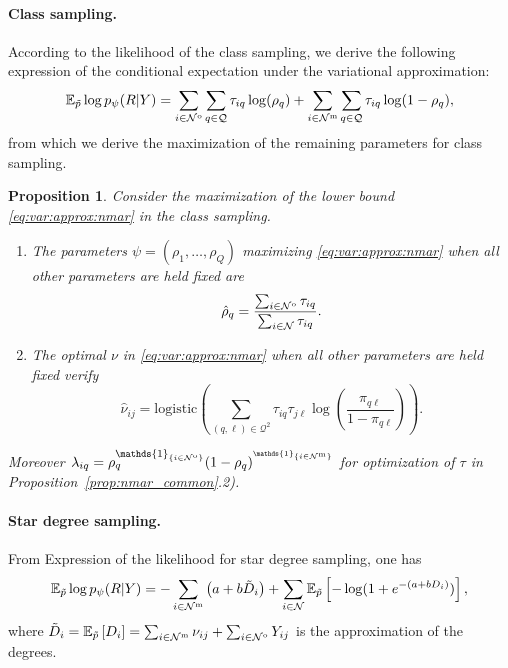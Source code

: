 \documentclass[10pt]{article}
\newcommand{\1}{\mathds{1}}
\newcommand{\MA}{Y}
\newcommand{\block}{\mathcal{Q}}
\newcommand{\node}{\mathcal{N}}
\newcommand{\nodeO}{\node^\text{\rm o}}
\newcommand{\nodeM}{\node^\text{\rm m}}
\newcommand{\Ebb}{\mathbb{E}}
\newtheorem{proposition}{Proposition}
\begin{document}
\paragraph*{\bf Class sampling.}  According to the
likelihood of the  class sampling, we derive
the  following expression  of the  conditional expectation  under the
variational approximation:
\begin{equation}\nonumber
  \mathbb{E}_{\tilde{p}} \log p_\psi(R|\MA)  = \sum_{i\in \nodeO}
  \sum_{q\in\block} \tau_{iq} \log(\rho_q) + 
  \sum_{i\in \nodeM}\sum_{q\in\block} \tau_{iq}\log(1-\rho_q),
\end{equation}
from which we derive the  maximization of the remaining parameters for
class sampling.

\begin{proposition}\label{prop:nmar_class}
  Consider     the     maximization     of     the     lower     bound
  \eqref{eq:var:approx:nmar} in the class sampling.
  \begin{enumerate}
  \item  The  parameters  $\psi  =  (\rho_1,\dots,\rho_Q)$  maximizing
    \eqref{eq:var:approx:nmar}  when  all  other parameters  are  held
    fixed are
    \begin{equation}
      \label{eq:rho_q}
      \hat{\rho}_q    =   \frac{\sum_{i\in\nodeO}\tau_{iq}}{\sum_{i\in\node}\tau_{iq}}.
    \end{equation}
  \item The optimal $\nu$ in \eqref{eq:var:approx:nmar} when all
    other parameters are held fixed verify
    \begin{equation}\nonumber
      \hat{\nu}_{ij} = \mathrm{logistic} \left( \sum_{(q,\ell)\in\block^2} \tau_{iq}\tau_{j\ell} \log\left(\frac{\pi_{q\ell}}{1-\pi_{q\ell}}\right) \right).
    \end{equation}
    
  \end{enumerate}
  Moreover   $\lambda_{iq}  =   \rho_q^{\1_{\{i\in\nodeO\}}}(1-\rho_q)^{^{\1_{\{i\in\nodeM\}}}}$  for
  optimization of $\tau$ in Proposition~\ref{prop:nmar_common}.2).
\end{proposition}

\paragraph*{\bf Star degree sampling.}  From
Expression of the  likelihood for star degree
sampling, one has
\begin{equation}\nonumber
  \mathbb{E}_{\tilde{p}} \log p_{\psi}(R|\MA)
  = -\sum_{i\in\nodeM} \left(a+b\tilde{D}_i \right)  + \sum_{i\in\node}  \Ebb_{\tilde{p}}\left[ -\log(1+e^{-(a+bD_i)}) \right],
\end{equation}
where
$\tilde{D}_i  =  \mathbb{E}_{\tilde{p}}\left[D_i   \right]  =  \sum_{i
  \in\nodeM}   \nu_{ij}  +   \sum_{i  \in\nodeO}   \MA_{ij}$  is   the
approximation of the degrees.
\end{document}
